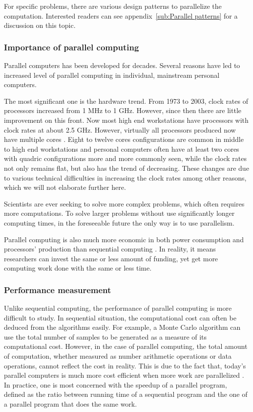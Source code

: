 For specific problems, there are various design patterns to parallelize the
computation. Interested readers can see appendix~\ref{sub:Parallel patterns}
for a discussion on this topic.

\subsubsection{Importance of parallel computing}
\label{ssub:Importance of parallel computing}

Parallel computers has been developed for decades. Several reasons have led to
increased level of parallel computing in individual, mainstream personal
computers.

The most significant one is the hardware trend. From 1973 to 2003, clock rates
of processors increased from 1 MHz to 1 GHz. However, since then there are
little improvement on this front. Now most high end workstations have
processors with clock rates at about 2.5 GHz. However, virtually all
processors produced now have multiple cores \cite{parallel}. Eight to twelve
cores configurations are common in middle to high end workstations and
personal computers often have at least two cores with quadric configurations
more and more commonly seen, while the clock rates not only remains flat, but
also has the trend of decreasing. These changes are due to various technical
difficulties in increasing the clock rates among other reasons, which we will
not elaborate further here.

Scientists are ever seeking to solve more complex problems, which often
requires more computations. To solve larger problems without use significantly
longer computing times, in the foreseeable future the only way is to use
parallelism.

Parallel computing is also much more economic in both power consumption and
processors' production than sequential computing \cite{parallel}. In reality,
it means researchers can invest the same or less amount of funding, yet get
more computing work done with the same or less time.

\subsubsection{Performance measurement}
\label{ssub:Performance measurement}

Unlike sequential computing, the performance of parallel computing is more
difficult to study. In sequential situation, the computational cost can often
be deduced from the algorithms easily. For example, a Monte Carlo algorithm
can use the total number of samples to be generated as a measure of its
computational cost. However, in the case of parallel computing, the total
amount of computation, whether measured as number arithmetic operations or
data operations, cannot reflect the cost in reality. This is due to the fact
that, today's parallel computers is much more cost efficient when more work
are parallelized \cite{parallel}. In practice, one is most concerned with the
speedup of a parallel program, defined as the ratio between running time of a
sequential program and the one of a parallel program that does the same work.

